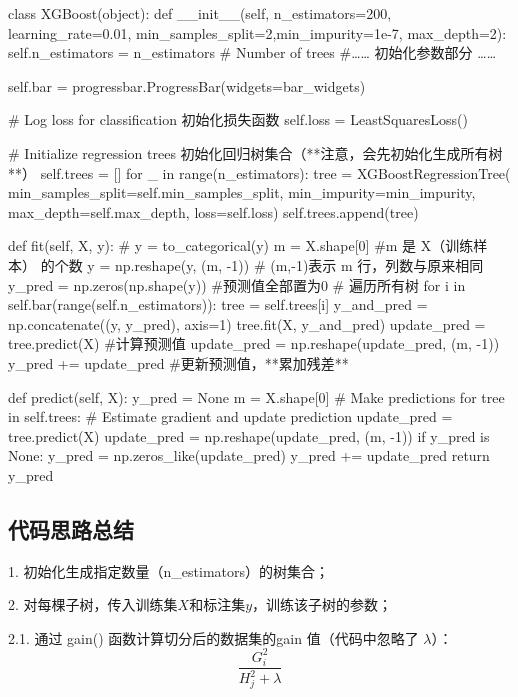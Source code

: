 \documentclass[12pt]{article}
\begin{document}
\begin{python}
class XGBoost(object):
	def __init__(self, n_estimators=200, learning_rate=0.01, min_samples_split=2,min_impurity=1e-7, max_depth=2):
        self.n_estimators = n_estimators  # Number of trees
        #…… 初始化参数部分 ……
        
        self.bar = progressbar.ProgressBar(widgets=bar_widgets)
	     
        # Log loss for classification 初始化损失函数
        self.loss = LeastSquaresLoss()
 
        # Initialize regression trees 初始化回归树集合（**注意，会先初始化生成所有树**）
        self.trees = []
        for _ in range(n_estimators):
            tree = XGBoostRegressionTree(
                min_samples_split=self.min_samples_split,
                min_impurity=min_impurity,
                max_depth=self.max_depth,
                loss=self.loss)
            self.trees.append(tree)

    def fit(self, X, y):
        # y = to_categorical(y)
        m = X.shape[0] #m 是 X（训练样本） 的个数
        y = np.reshape(y, (m, -1))  # (m,-1)表示 m 行，列数与原来相同
        y_pred = np.zeros(np.shape(y)) #预测值全部置为0
        # 遍历所有树
        for i in self.bar(range(self.n_estimators)):
            tree = self.trees[i]
            y_and_pred = np.concatenate((y, y_pred), axis=1)
            tree.fit(X, y_and_pred) 
            update_pred = tree.predict(X) #计算预测值
            update_pred = np.reshape(update_pred, (m, -1))
            y_pred += update_pred #更新预测值，**累加残差**
            
    def predict(self, X):
        y_pred = None
        m = X.shape[0]
        # Make predictions
        for tree in self.trees:
            # Estimate gradient and update prediction
            update_pred = tree.predict(X)
            update_pred = np.reshape(update_pred, (m, -1))
            if y_pred is None:
                y_pred = np.zeros_like(update_pred)
            y_pred += update_pred
        return y_pred
\end{python}

\subsection{代码思路总结}
1. 初始化生成指定数量（n\_estimators）的树集合；

2. 对每棵子树，传入训练集$X$和标注集$y$，训练该子树的参数；

2.1. 通过 gain() 函数计算切分后的数据集的gain 值（代码中忽略了 $\lambda$）：
$$
\frac{G_i^2}{H_j^2+\lambda}
$$
\end{document}
